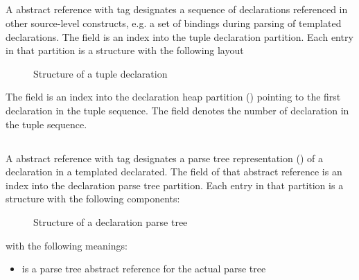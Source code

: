 

\subsection{}
\label{sec:ifc:DeclSort:Tuple}

A  abstract reference with tag  designates a sequence
of declarations referenced in other source-level constructs, e.g. a set of bindings during 
parsing of templated declarations.  The  field is an index into the
tuple declaration partition.  Each entry in that partition is a structure with the following
layout
%
\begin{figure}[H]
	\centering
	\caption{Structure of a tuple declaration}
	\label{fig:ifc-tuple-declaration-structure}
\end{figure}
%
The  field is an index into the declaration heap 
partition () pointing to the first declaration in 
the tuple sequence.  The  field
denotes the number of declaration in the tuple sequence.




\subsection{}
\label{sec:ifc:DeclSort:SyntaxTree}

A  abstract reference with tag  designates a parse tree
representation () of a declaration in a templated declarated.
The  field of that abstract reference is an index into the declaration parse tree partition.
Each entry in that partition is a structure with the following components:
%
\begin{figure}[H]
	\centering
	\caption{Structure of a declaration parse tree}
	\label{fig:ifc-DeclSort-SyntaxTree-structure}
\end{figure}
%
with the following meanings:
\begin{itemize}
	\item {} is a parse tree abstract reference for the actual parse tree
\end{itemize}

